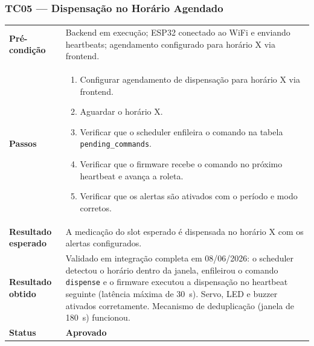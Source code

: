 \documentclass[12pt,a4paper]{article}
\newcommand{\lightrule}{\arrayrulecolor{gray!35}\midrule\arrayrulecolor{black}}
\newcommand{\aprovado}{\textcolor{green!60!black}{\textbf{Aprovado}}}
\begin{document}
\subsubsection{TC05 — Dispensação no Horário Agendado}
\begin{table}[H]\small\setlength{\tabcolsep}{6pt}\renewcommand{\arraystretch}{1.3}
\begin{tabularx}{\textwidth}{>{\bfseries}p{4cm} X}
\toprule
Pré-condição & Backend em execução; ESP32 conectado ao WiFi e enviando heartbeats; agendamento configurado para horário X via frontend. \\
\lightrule
Passos &
\begin{enumerate}[nosep,leftmargin=*]
  \item Configurar agendamento de dispensação para horário X via frontend.
  \item Aguardar o horário X.
  \item Verificar que o scheduler enfileira o comando na tabela \texttt{pending\_commands}.
  \item Verificar que o firmware recebe o comando no próximo heartbeat e avança a roleta.
  \item Verificar que os alertas são ativados com o período e modo corretos.
\end{enumerate} \\
\lightrule
Resultado esperado & A medicação do slot esperado é dispensada no horário X com os alertas configurados. \\
\lightrule
Resultado obtido & Validado em integração completa em 08/06/2026: o scheduler detectou o horário dentro da janela, enfileirou o comando \texttt{dispense} e o firmware executou a dispensação no heartbeat seguinte (latência máxima de 30~s). Servo, LED e buzzer ativados corretamente. Mecanismo de deduplicação (janela de 180~s) funcionou. \\
\lightrule
Status & \aprovado \\
\bottomrule
\end{tabularx}\end{table}
\end{document}
